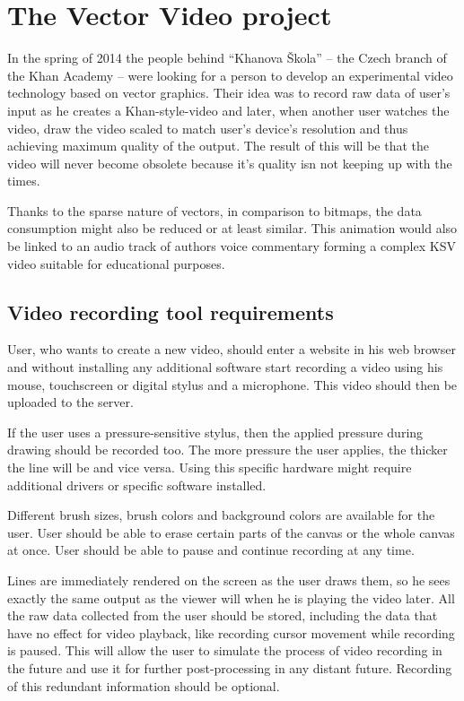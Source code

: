 \chapter{The Vector Video project}

In the spring of 2014 the people behind ``Khanova Škola'' -- the Czech branch of the Khan Academy -- were looking for a person to develop an experimental video technology based on vector graphics. Their idea was to record raw data of user's input as he creates a Khan-style-video and later, when another user watches the video, draw the video scaled to match user's device's resolution and thus achieving maximum quality of the output. The result of this will be that the video will never become obsolete because it's quality isn not keeping up with the times.

Thanks to the sparse nature of vectors, in comparison to bitmaps, the data consumption might also be reduced or at least similar. This animation would also be linked to an audio track of authors voice commentary forming a complex KSV video suitable for educational purposes.

\section{Video recording tool requirements}
User, who wants to create a new video, should enter a website in his web browser and without installing any additional software start recording a video using his mouse, touchscreen or digital stylus and a microphone. This video should then be uploaded to the server.

If the user uses a pressure-sensitive stylus, then the applied pressure during drawing should be recorded too. The more pressure the user applies, the thicker the line will be and vice versa. Using this specific hardware might require additional drivers or specific software installed.

Different brush sizes, brush colors and background colors are available for the user. User should be able to erase certain parts of the canvas or the whole canvas at once. User should be able to pause and continue recording at any time.

Lines are immediately rendered on the screen as the user draws them, so he sees exactly the same output as the viewer will when he is playing the video later. All the raw data collected from the user should be stored, including the data that have no effect for video playback, like recording cursor movement while recording is paused. This will allow the user to simulate the process of video recording in the future and use it for further post-processing in any distant future. Recording of this redundant information should be optional.

